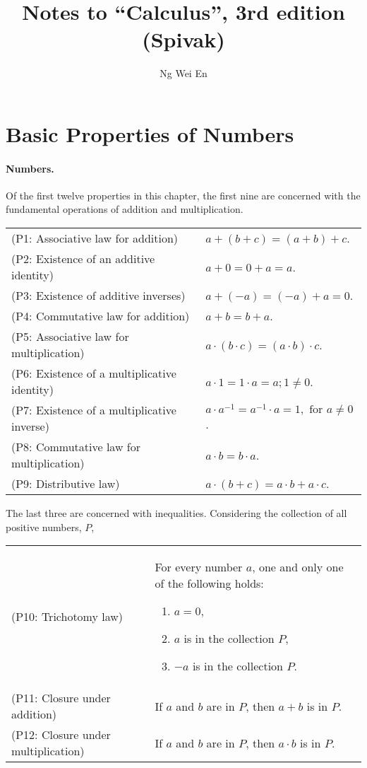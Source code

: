 \documentclass{article}
\title{Notes to ``Calculus'', 3rd edition (Spivak)}
\author{Ng Wei En}
\numberwithin{definition}{subsection}
\numberwithin{lemma}{subsection}
\numberwithin{theorem}{subsection}
\begin{document}
\maketitle

\section{Basic Properties of Numbers}

\paragraph{Numbers.} Of the first twelve properties in this chapter, the first
nine are concerned with the fundamental operations of addition and
multiplication.

\begin{tabular}{l p{1.6in}}
  (P1: Associative law for addition) & $a + (b + c) = (a + b) + c$. \\
  (P2: Existence of an additive identity) & $a + 0 = 0 + a = a$. \\
  (P3: Existence of additive inverses) & $a + (-a) = (-a) + a = 0$. \\
  (P4: Commutative law for addition) & $a + b = b + a$. \\
  (P5: Associative law for multiplication) & $a \cdot (b \cdot c) = (a \cdot
    b) \cdot c$. \\
  (P6: Existence of a multiplicative identity) & $a \cdot 1 = 1 \cdot a = a; 1
    \neq 0$. \\
  (P7: Existence of a multiplicative inverse) & $a \cdot a^{-1} = a^{-1} \cdot
    a = 1, \text{ for } a \neq 0$. \\
  (P8: Commutative law for multiplication) & $a \cdot b = b \cdot a$. \\
  (P9: Distributive law) & $a \cdot (b + c) = a \cdot b + a \cdot c$.
\end{tabular}

The last three are concerned with inequalities. Considering the collection of
all positive numbers, $P$,

\begin{tabular}{l p{2in}}
  (P10: Trichotomy law) & For every number $a$, one and only one of the
    following holds:
    \begin{enumerate}
      \itemsep0em
      \item $a = 0$,
      \item $a$ is in the collection $P$,
      \item $-a$ is in the collection $P$.
    \end{enumerate} \\
  (P11: Closure under addition) & If $a$ and $b$ are in $P$, then $a + b$ is
    in $P$. \\
  (P12: Closure under multiplication) & If $a$ and $b$ are in $P$, then $a
    \cdot b$ is in $P$.
\end{tabular}
\end{document}

